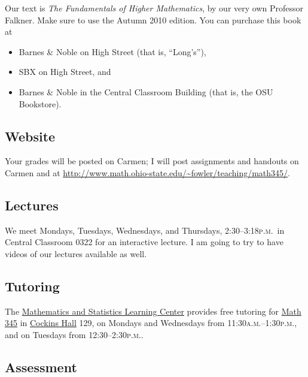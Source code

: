 \documentclass[12pt]{handout}
\newcommand{\peem}{\textsc{p.m.}}
\newcommand{\ayem}{\textsc{a.m.}}
\begin{document}
Our text is \textit{The Fundamentals of Higher
Mathematics}, by our very own Professor Falkner.  Make sure to use the
Autumn 2010 edition.  You can purchase this book at
\begin{itemize}
\item Barnes \& Noble on High Street (that is, ``Long's''),
\item SBX on High Street, and
\item Barnes \& Noble in the Central Classroom Building (that is, the OSU Bookstore).
\end{itemize}

\subsection*{Website}
Your grades will be posted on Carmen; I will post assignments and handouts on Carmen and at
\url{http://www.math.ohio-state.edu/~fowler/teaching/math345/}.

\subsection*{Lectures}
We meet Mondays, Tuesdays, Wednesdays, and Thursdays,
2:30--3:18\peem\ in Central Classroom 0322 for an interactive lecture.  I am going to try to have videos of our lectures available as well.

\subsection*{Tutoring}

The \href{http://www.mslc.ohio-state.edu/}{Mathematics and Statistics Learning Center} provides free tutoring
for \href{http://www.mslc.ohio-state.edu/about/location/345}{Math 345} in \href{http://www.osu.edu/map/building.php?building=063}{Cockins Hall} 129, on Mondays and Wednesdays from 11:30\ayem--1:30\peem, and on Tuesdays from 12:30--2:30\peem.


\vfill
\pagebreak
\subsection*{Assessment}
\end{document}
